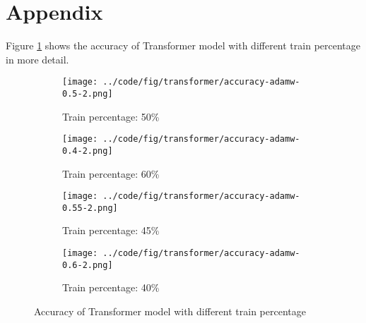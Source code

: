 \documentclass{article}
\begin{document}
\appendix

\section{Appendix}

Figure \ref{fig:transformer-accuracy-all} shows the accuracy of Transformer model with different train percentage in more detail.

\begin{figure}[ht]
    \centering
    \begin{subfigure}{0.45\textwidth}
        \texttt{[image: ../code/fig/transformer/accuracy-adamw-0.5-2.png]}
        \caption{Train percentage: 50\%}
    \end{subfigure}
    \begin{subfigure}{0.45\textwidth}
        \texttt{[image: ../code/fig/transformer/accuracy-adamw-0.4-2.png]}
        \caption{Train percentage: 60\%}
    \end{subfigure}
    \begin{subfigure}{0.45\textwidth}
        \texttt{[image: ../code/fig/transformer/accuracy-adamw-0.55-2.png]}
        \caption{Train percentage: 45\%}
    \end{subfigure}
    \begin{subfigure}{0.45\textwidth}
        \texttt{[image: ../code/fig/transformer/accuracy-adamw-0.6-2.png]}
        \caption{Train percentage: 40\%}
    \end{subfigure}
    \caption{Accuracy of Transformer model with different train percentage}
    \label{fig:transformer-accuracy-all}
\end{figure}



\end{document}
